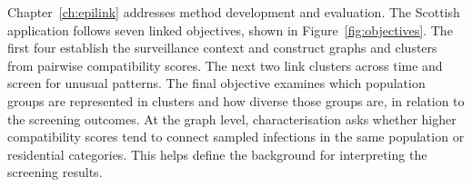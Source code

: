 Chapter~\ref{ch:epilink} addresses method development and evaluation. The Scottish application follows seven linked objectives, shown in Figure~\ref{fig:objectives}. The first four establish the surveillance context and construct graphs and clusters from pairwise compatibility scores. The next two link clusters across time and screen for unusual patterns. The final objective examines which population groups are represented in clusters and how diverse those groups are, in relation to the screening outcomes. At the graph level, characterisation asks whether higher compatibility scores tend to connect sampled infections in the same population or residential categories. This helps define the background for interpreting the screening results.


